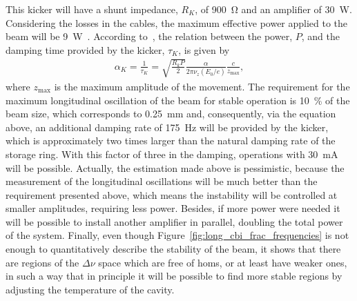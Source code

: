     This kicker will have a shunt impedance, $R_K$, of \SI{900}{\ohm} and an amplifier of \SI{30}{\watt}. Considering the losses in the cables, the maximum effective power applied to the beam will be \SI{9}{\watt}~\cite{Duarte2018}. According to~, the relation between the power, $P$, and the damping time provided by the kicker, $\tau_K$, is given by
    \begin{align}
        \alpha_K = \frac{1}{\tau_K} =
        \sqrt{\frac{R_kP}{2}}\frac{\alpha}{2\pi\nu_z(E_0/e)}\frac{c}{z_\text{max}},
    \end{align}
    where $z_\text{max}$ is the maximum amplitude of the movement. The requirement for the maximum longitudinal oscillation of the beam for stable operation is \SI{10}{\percent} of the beam size, which corresponds to \SI{0.25}{\milli\meter} and, consequently, via the equation above, an additional damping rate of \SI{175}{\hertz} will be provided by the kicker, which is approximately two times larger than the natural damping rate of the storage ring. With this factor of three in the damping, operations with \SI{30}{\milli\ampere} will be possible. Actually, the estimation made above is pessimistic, because the measurement of the longitudinal oscillations will be much better than the requirement presented above, which means the instability will be controlled at smaller amplitudes, requiring less power. Besides, if more power were needed it will be possible to install another amplifier in parallel, doubling the total power of the system. Finally, even though Figure~\ref{fig:long_cbi_frac_frequencies} is not enough to quantitatively describe the stability of the beam, it shows that there are regions of the $\Delta \nu$ space which are free of \glspl{hom}, or at least have weaker ones, in such a way that in principle it will be possible to find more stable regions by adjusting the temperature of the cavity.

